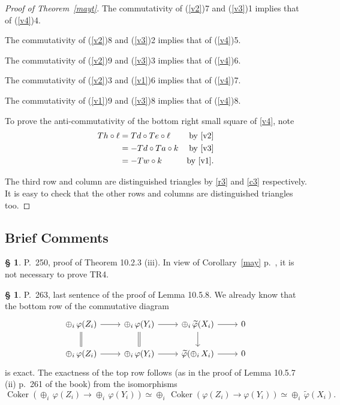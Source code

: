 \documentclass[12pt]{article}%
\theoremstyle{remark}
\theoremstyle{definition}
\newtheorem{s}[thm]{\S}%
\newcommand{\pp}{\varphi}
\DeclareMathOperator{\Coker}{Coker}
\begin{document}
\begin{proof}[Proof of Theorem~\ref{mayt}]
The commutativity of (\ref{v2})7 and (\ref{v3})1 implies that of (\ref{v4})4.

The commutativity of (\ref{v2})8 and (\ref{v3})2 implies that of (\ref{v4})5. 

The commutativity of (\ref{v2})9 and (\ref{v3})3 implies that of (\ref{v4})6. 

The commutativity of (\ref{v2})3 and (\ref{v1})6 implies that of (\ref{v4})7. 

The commutativity of (\ref{v1})9 and (\ref{v3})8 implies that of (\ref{v4})8. 

To prove the anti-commutativity of the bottom right small square of \eqref{v4}, note 
%
\begin{align*}
Th\circ\ell&=Td\circ Te\circ\ell&\text{by \eqref{v2}}\\ 
&=-Td\circ Ta\circ k&\text{by \eqref{v3}}\\  
&=-Tw\circ k&\text{by \eqref{v1}}.
\end{align*} 

The third row and column are distinguished triangles by \eqref{r3} and \eqref{c3} respectively. It is easy to check that the other rows and columns are distinguished triangles too.
\end{proof}


\subsection{Brief Comments}

\begin{s} 
P.~250, proof of Theorem 10.2.3 (iii). In view of Corollary~\ref{may} p.~\pageref{may}, it is not necessary to prove TR4.
\end{s}

%

\begin{s} P.~263, last sentence of the proof of Lemma 10.5.8. We already know that the bottom row of the commutative diagram 
$$
\begin{tikzcd}
\oplus_i\,\pp(Z_i)\ar[equal]{d}\ar{r}&\oplus_i\,\pp(Y_i)\ar[equal]{d}\ar{r}&\oplus_i\,\widetilde\pp(X_i)\ar{d}\ar{r}&0\\ 
\oplus_i\,\pp(Z_i)\ar{r}&\oplus_i\,\pp(Y_i)\ar{r}&\widetilde\pp(\oplus_i\,X_i)\ar{r}&0 
\end{tikzcd}
$$ 
is exact. The exactness of the top row follows (as in the proof of Lemma 10.5.7 (ii) p.~261 of the book) from the isomorphisms 
$$
\Coker(\oplus_i\,\pp(Z_i)\to\oplus_i\,\pp(Y_i))\simeq\oplus_i\,\Coker(\pp(Z_i)\to\pp(Y_i))\simeq\oplus_i\,\widetilde\pp(X_i).
$$
\end{s}
\end{document}
